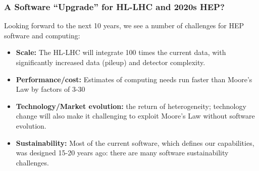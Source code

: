 \begin{frame}
\frametitle{A Software ``Upgrade'' for HL-LHC and 2020s HEP?}

Looking forward to the next 10 years, we see a number of challenges for HEP software and computing:

\begin{itemize}
\item {\bf Scale:} The HL-LHC will integrate 100 times the current data, with significantly increased data (pileup) and detector complexity.
\item {\bf Performance/cost:} Estimates of computing needs run faster than Moore's Law by factors of 3-30
\item {\bf Technology/Market evolution:} the return of heterogeneity; technology change will also make it challenging to exploit Moore's Law without software evolution.
\item {\bf Sustainability:} Most of the current software, which defines our capabilities, was designed 15-20 years ago: there are many software sustainability challenges.
\end{itemize}

\end{frame}


